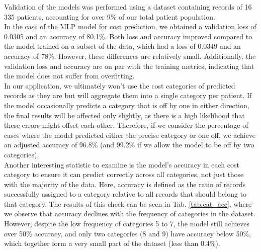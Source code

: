 Validation of the models was performed using a dataset containing records of 16 335 patients, accounting for over 9\% of our total patient population.
\\

In the case of the MLP model for cost prediction, we obtained a validation loss of 0.0305 and an accuracy of 80.1\%. Both loss and accuracy improved compared to the model trained on a subset of the data, which had a loss of 0.0349 and an accuracy of 78\%. However, these differences are relatively small. Additionally, the validation loss and accuracy are on par with the training metrics, indicating that the model does not suffer from overfitting.
\\

In our application, we ultimately won't use the cost categories of predicted records as they are but will aggregate them into a single category per patient. If the model occasionally predicts a category that is off by one in either direction, the final results will be affected only slightly, as there is a high likelihood that these errors might offset each other. Therefore, if we consider the percentage of cases where the model predicted either the precise category or one off, we achieve an adjusted accuracy of 96.8\% (and 99.2\% if we allow the model to be off by two categories). 
\\

Another interesting statistic to examine is the model's accuracy in each cost category to ensure it can predict correctly across all categories, not just those with the majority of the data. Here, accuracy is defined as the ratio of records successfully assigned to a category relative to all records that should belong to that category.  The results of this check can be seen in Tab. \ref{tab:cat_acc}, where we observe that accuracy declines with the frequency of categories in the dataset. However, despite the low frequency of categories 5 to 7, the model still achieves over 50\% accuracy, and only two categories (8 and 9) have accuracy below 50\%, which together form a very small part of the dataset (less than 0.4\%).
\\

